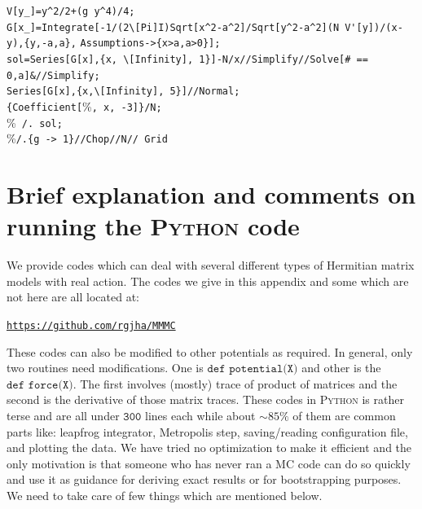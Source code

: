 \documentclass[11pt]{article}
\newcommand{\PY}{\textsc{Python }}
\begin{document}
\begin{mdframed}[backgroundcolor=magenta!3] 
	\begin{footnotesize} 
		\noindent 
		\verb"V[y_]=y^2/2+(g y^4)/4;"\\
		\verb"G[x_]=Integrate[-1/(2\[Pi]I)Sqrt[x^2-a^2]/Sqrt[y^2-a^2](N V'[y])/(x-y),{y,-a,a}," \newline
		\verb"Assumptions->{x>a,a>0}];"\\
		\verb"sol=Series[G[x],{x, \[Infinity], 1}]-N/x//Simplify//Solve[# == 0,a]&//Simplify; "\\
		\verb"Series[G[x],{x,\[Infinity], 5}]//Normal; "\\
		\verb"{Coefficient["\%\verb", x, -3]}/N;"\\
		\%\verb" /. sol;"\\
		\%\verb"/.{g -> 1}//Chop//N// Grid"
	\end{footnotesize} 
\end{mdframed}

\section{\label{sec:BEOC}Brief explanation and comments on 
running the \PY code}
We provide codes which can deal with several different types of 
Hermitian matrix models with real action. The codes we give 
in this appendix and some which are not here are all located at:  
\begin{center} \texttt{\href{https://github.com/rgjha/MMMC}{https://github.com/rgjha/MMMC}} \end{center}
These codes can also be modified to other potentials as required.
In general, only two routines need modifications. 
One is $\texttt{def potential(X)}$ and 
other is the $\texttt{def force(X)}$. The first involves (mostly) 
trace of product of matrices and the second is the derivative of those matrix traces. 
These codes in \PY is rather terse
and are all under $\texttt{300}$ lines each
while about $\sim 85\%$ of them are common parts like:
leapfrog integrator, Metropolis step, saving/reading configuration file, 
and plotting the data. We have tried no optimization to make it efficient and the
only motivation is that someone who has never ran a MC code can do
so quickly and use it as guidance for deriving exact results or for
bootstrapping purposes. We need to take care of few things which are 
mentioned below.  
\end{document}
